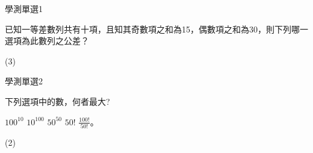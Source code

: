     \begin{QUESTION}
        \begin{ExamInfo}{93}{學測}{單選}{1}
        \end{ExamInfo}
        \begin{ExamAnsRateInfo}{71}{93}{79}{41}
        \end{ExamAnsRateInfo}
        \begin{QBODY}
            已知一等差數列共有十項，且知其奇數項之和為15，偶數項之和為30，則下列哪一選項為此數列之公差？ 
            \begin{QOPS} 
            \end{QOPS}
        \end{QBODY}
        \begin{QFROMS}
        \end{QFROMS}
        \begin{QTAGS}\end{QTAGS}
        \begin{QANS}
            (3)
        \end{QANS}
        \begin{QSOLLIST}
        \end{QSOLLIST}
        \begin{QEMPTYSPACE}
        \end{QEMPTYSPACE}
    \end{QUESTION}
    \begin{QUESTION}
        \begin{ExamInfo}{93}{學測}{單選}{2}
        \end{ExamInfo}
        \begin{ExamAnsRateInfo}{60}{85}{62}{33}
        \end{ExamAnsRateInfo}
        \begin{QBODY}
            下列選項中的數，何者最大? 
            \begin{QOPS} 
                \QOP $100^{10}$ 
                \QOP $10^{100}$ 
                \QOP $50^{50} $
                \QOP $50!$ 
                \QOP $\frac{100!}{50!}$。 
            \end{QOPS}
        \end{QBODY}
        \begin{QFROMS}
        \end{QFROMS}
        \begin{QTAGS}\end{QTAGS}
        \begin{QANS}
            (2)
        \end{QANS}
        \begin{QSOLLIST}
        \end{QSOLLIST}
        \begin{QEMPTYSPACE}
        \end{QEMPTYSPACE}
    \end{QUESTION}
